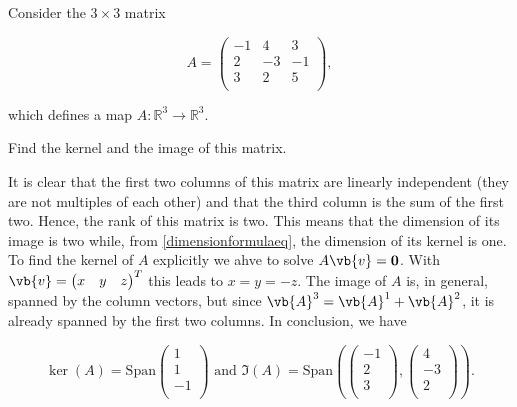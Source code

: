 \documentclass[a4paper,12pt]{report}
\begin{document}
{Consider the \(3 \times 3\) matrix

\begin{equation}
    A = \begin{pmatrix}
        -1 & 4 &  3 \\
        2 & -3 &  -1 \\
        3 & 2 &  5 \\
    \end{pmatrix},
\end{equation}

which defines a map \(A: \mathbb{R}^3 \rightarrow \mathbb{R}^3 \). 

Find the kernel and the image of this matrix.}
{It is clear that the first two columns of this matrix are linearly independent (they are not multiples of each other) and that the third column is the sum of the first two. Hence, the rank of this matrix is two. This means that the dimension of its image is two while, from \cref{dimensionformulaeq}, the dimension of its kernel is one. To find the kernel of \(A\) explicitly we ahve to solve \(A\vb{v} = \boldsymbol{0} \). With \(\vb{v} = \begin{pmatrix}
    x & y &  z \\
\end{pmatrix}^{T} \) this leads to \(x=y=-z\). The image of \(A\) is, in general, spanned by the column vectors, but since \(\vb{A} ^3 = \vb{A} ^{1} + \vb{A} ^2  \), it is already spanned by the first two columns. In conclusion, we have

\begin{equation}
    \ker (A) = \text{Span} \begin{pmatrix}
         1 \\
         1 \\
         -1 \\
    \end{pmatrix} \text { and } \Im (A) = \text{Span} \left( \begin{pmatrix}
         -1 \\
         2 \\
         3 \\
    \end{pmatrix}, \begin{pmatrix}
         4 \\
         -3 \\
         2 \\
    \end{pmatrix} \right). 
\end{equation}} 
\end{document}
